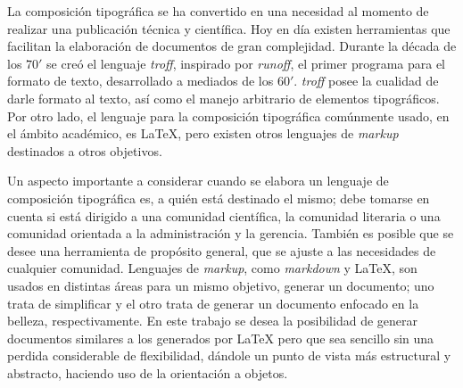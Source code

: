 \documentclass[10pt,letterpaper]{article}
\newcommand{\troff}{\textit{troff}\xspace}
\newcommand{\latex}{\LaTeX\xspace}
\begin{document}
La composición tipográfica se ha convertido en una necesidad al momento de
realizar una publicación técnica y científica. Hoy en día existen herramientas que
facilitan la elaboración de documentos de gran complejidad. Durante la década de los
$70'$ se creó el lenguaje \troff, inspirado por \textit{runoff}, el primer programa
para el formato de texto, desarrollado a mediados de los $60'$. \troff posee la
cualidad de darle formato al texto, así como el manejo arbitrario de elementos
tipográficos. Por otro lado, el lenguaje para la composición tipográfica comúnmente
usado, en el ámbito académico, es \latex, pero existen otros lenguajes de
\textit{markup} destinados a otros objetivos.

Un aspecto importante a considerar cuando se elabora un lenguaje de composición
tipográfica es, a quién está destinado el mismo; debe tomarse en cuenta si está
dirigido a una comunidad científica, la comunidad literaria o una comunidad orientada
a la administración y la gerencia. También es posible que se desee una herramienta de
propósito general, que se ajuste a las necesidades de cualquier comunidad. Lenguajes
de \textit{markup}, como \textit{markdown} y \LaTeX, son usados en distintas áreas
para un mismo objetivo, generar un documento; uno trata de simplificar y el otro
trata de generar un documento enfocado en la belleza, respectivamente. En este trabajo se desea la posibilidad de generar documentos similares a los generados por \latex pero que sea sencillo sin una perdida considerable de flexibilidad, dándole un punto de vista más estructural y abstracto, haciendo uso de la orientación a objetos.
\end{document}
